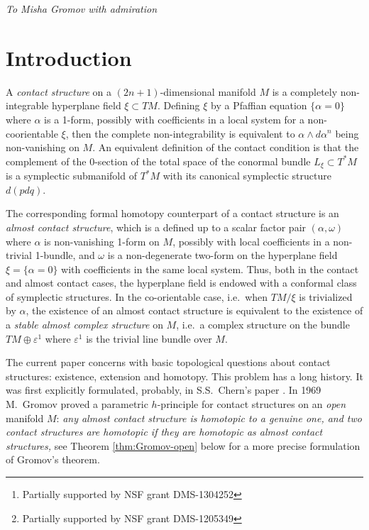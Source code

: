 \documentclass[12pt]{paper}
\author{Matthew Strom  Borman\thanks{Partially supported by NSF grant   DMS-1304252} \\ Stanford University\and Yakov Eliashberg\thanks{Partially supported by  NSF grant DMS-1205349} \\ Stanford University  \and   Emmy Murphy
\\ MIT}
\date{}
\theoremstyle{plain}
\theoremstyle{definition}
\newcommand{\eps}{\varepsilon}
\numberwithin{figure}{section}
\begin{document}
\maketitle
\centerline{\small{\em To Misha Gromov with admiration}}

\begin{abstract}
We establish a parametric extension $h$-principle for overtwisted contact structures on manifolds of all dimensions,  which is the direct generalization of the $3$-dimensional result from \cite{Eli89}. It implies, in particular,  that any closed   manifold admits a contact structure in any given homotopy class of almost contact structures. 
\end{abstract}
\bigskip

\section{Introduction}
A {\em contact structure} on a  $(2n+1)$-dimensional manifold $M$  is a completely non-integrable hyperplane field $\xi\subset TM$. Defining $\xi$ by a Pfaffian equation $\{\alpha=0\}$ where $\alpha $ is a 1-form, possibly with coefficients in a local system for a non-coorientable $\xi$, then the complete non-integrability is equivalent to $\alpha\wedge d\alpha^n$ being non-vanishing on $M$. An equivalent definition of the contact condition is that the complement of the $0$-section of the total space of the  conormal bundle $L_\xi\subset T^*M$ is a symplectic submanifold of $T^*M$ with its canonical symplectic structure $d(pdq)$. 


The corresponding formal homotopy counterpart of a contact structure is an {\it almost contact structure}, which  is   a defined up to a scalar factor  pair  $(\alpha,\omega)$ where $\alpha$ is non-vanishing 1-form on $M$, possibly with local coefficients in a non-trivial 1-bundle, and $\omega$ is a non-degenerate two-form on the hyperplane field $\xi=\{\alpha=0\}$  with coefficients in the same local system.  Thus, both  in the contact and almost contact cases, the hyperplane field is endowed with a conformal class of symplectic structures.  In the co-orientable case, i.e.\ when  $TM/\xi$ is trivialized by $\alpha$, the existence of an almost contact structure is equivalent to the existence of a {\it stable almost complex structure} on $M$, i.e.\ a complex structure on the bundle $TM\oplus\eps^1$ where $\eps^1$ is the trivial line bundle over $M$.

The current paper concerns with basic topological questions about contact structures: existence, extension and homotopy. 
This problem  has a long history. It was first explicitly formulated, probably, in S.S.~Chern's paper \cite{Chern66}.
In 1969 M.~Gromov \cite{Gro69} proved a parametric $h$-principle for contact structures on an {\em open} manifold $M$: {\it any almost contact structure is homotopic to a genuine one, and two contact structures are homotopic if they are homotopic as almost contact structures, }  see
Theorem \ref{thm:Gromov-open} below for a more precise formulation of Gromov's theorem.
\end{document}
